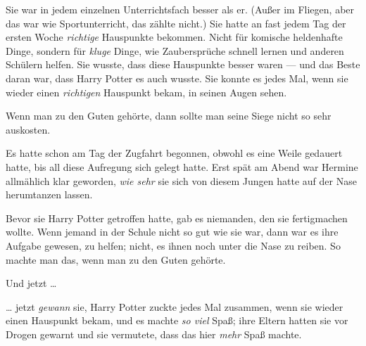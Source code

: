 Sie war in jedem einzelnen Unterrichtsfach besser als er. (Außer im Fliegen, aber das war wie Sportunterricht, das zählte nicht.) Sie hatte an fast jedem Tag der ersten Woche \emph{richtige} Hauspunkte bekommen. Nicht für komische heldenhafte Dinge, sondern für \emph{kluge} Dinge, wie Zaubersprüche schnell lernen und anderen Schülern helfen. Sie wusste, dass diese Hauspunkte besser waren — und das Beste daran war, dass Harry Potter es auch wusste. Sie konnte es jedes Mal, wenn sie wieder einen \emph{richtigen} Hauspunkt bekam, in seinen Augen sehen.

Wenn man zu den Guten gehörte, dann sollte man seine Siege nicht so sehr auskosten.

Es hatte schon am Tag der Zugfahrt begonnen, obwohl es eine Weile gedauert hatte, bis all diese Aufregung sich gelegt hatte. Erst spät am Abend war Hermine allmählich klar geworden, \emph{wie sehr} sie sich von diesem Jungen hatte auf der Nase herumtanzen lassen.

Bevor sie Harry Potter getroffen hatte, gab es niemanden, den sie fertigmachen wollte. Wenn jemand in der Schule nicht so gut wie sie war, dann war es ihre Aufgabe gewesen, zu helfen; nicht, es ihnen noch unter die Nase zu reiben. So machte man das, wenn man zu den Guten gehörte.

Und jetzt …

… jetzt \emph{gewann} sie, Harry Potter zuckte jedes Mal zusammen, wenn sie wieder einen Hauspunkt bekam, und es machte \emph{so viel} Spaß; ihre Eltern hatten sie vor Drogen gewarnt und sie vermutete, dass das hier \emph{mehr} Spaß machte.

